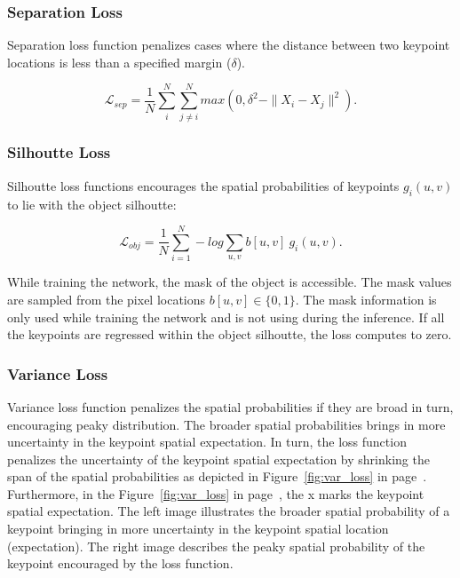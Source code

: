 \subsubsection{Separation Loss}

Separation loss function penalizes cases where the distance between two keypoint locations is less than a specified margin ($\delta$).

\begin{equation}
    \mathcal{L}_{sep} = \dfrac{1}{N} \displaystyle\sum_i^N \displaystyle\sum_{j\neq i}^N max(0, \delta^2 - \| X_i - X_j \|^2).
\end{equation}







\subsubsection{Silhoutte Loss}

Silhoutte loss functions encourages the spatial probabilities of keypoints $g_i(u, v)$ to lie with the object silhoutte:

\begin{equation}
    \mathcal{L}_{obj} = \dfrac{1}{N} \displaystyle\sum^N_{i=1} -log \displaystyle\sum_{u, v} b[u, v] \ g_i(u, v).
\end{equation}

While training the network, the mask of the object is accessible. The mask values are sampled from the pixel locations $b[u, v] \in \{0, 1\}$. The mask information is only used
while training the network and is not using during the inference. If all the keypoints are regressed within the object silhoutte, the loss computes to zero.








\subsubsection{Variance Loss}

Variance loss function penalizes the spatial probabilities if they are broad in turn, encouraging peaky distribution.
The broader spatial probabilities brings in more uncertainty in the keypoint spatial expectation.
In turn, the loss function penalizes the uncertainty of the keypoint spatial expectation by shrinking the span of the spatial probabilities as depicted in Figure~\ref{fig:var_loss} in page~\pageref{fig:var_loss}.
Furthermore, in the Figure~\ref{fig:var_loss} in page~\pageref{fig:var_loss}, the x marks the keypoint spatial expectation. The left image illustrates the broader spatial probability of a keypoint bringing in more
uncertainty in the keypoint spatial location (expectation). The right image describes the peaky spatial probability of the keypoint encouraged by the loss function. \\

